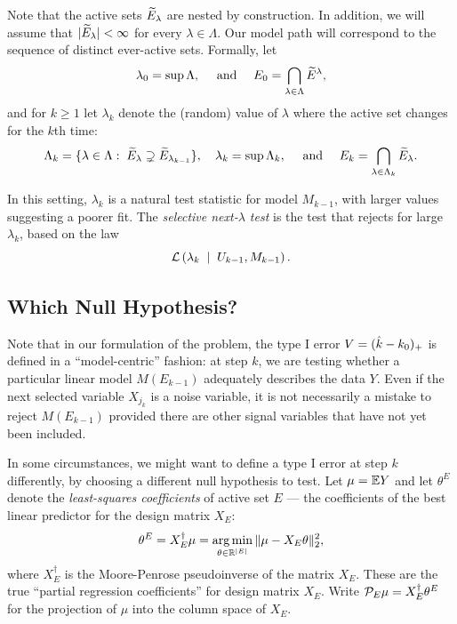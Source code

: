 \documentclass{article}
\begin{document}
Note that the active sets $\widetilde{E}_\lambda$ are nested by construction. In addition, we will assume that $|\widetilde{E}_\lambda|<\infty$ for every $\lambda\in\Lambda$. Our model path will correspond to the sequence of distinct ever-active sets. 
Formally, let 
\[
\lambda_0=\sup \Lambda, \quad \text{ and } \quad 
E_0 = \bigcap_{\lambda\in \Lambda} \widetilde{E}^\lambda,
\]
and for $k\geq 1$ let $\lambda_k$ denote the (random) value of $\lambda$ where the active set changes for the $k$th time:
\begin{equation}
  \Lambda_k = \{\lambda\in \Lambda:\; \widetilde{E}_\lambda \supsetneq \widetilde{E}_{\lambda_{k-1}}\},
  \quad
  \lambda_k = \sup\Lambda_k,
  \quad \text{ and } \quad
  E_k = \bigcap_{\lambda\in\Lambda_k} \widetilde{E}_{\lambda}.
\end{equation}

In this setting, $\lambda_k$ is a natural test statistic for model $M_{k-1}$, with larger values suggesting a poorer fit. The {\em selective next-$\lambda$ test} is the test that rejects for large $\lambda_k$, based on the law
\begin{equation}
\mathcal{L}\left(\lambda_k \;\mid\; U_{k-1}, M_{k-1}\right).
\end{equation}

\subsection{Which Null Hypothesis?}
\label{sec:whichnull}

Note that in our formulation of the problem, the type I error $V=(\hat{k}-k_0)_+$ is defined in a ``model-centric'' fashion: at step $k$, we are testing  whether a particular linear model $M(E_{k-1})$ adequately describes the data $Y$. Even if the next selected variable $X_{j_k}$ is a noise variable, it is not necessarily a mistake to reject $M(E_{k-1})$ provided there are other signal variables that have not yet been included.

In some circumstances, we might want to define a type I error at step $k$ differently, by choosing a different null hypothesis to test. Let $\mu = \mathbb{E} Y$ and let $\theta^E$ denote the {\em least-squares coefficients} of active set $E$ --- the coefficients of the best linear predictor for the design matrix $X_E$:
\[
\theta^E = X_E^\dagger \mu = \operatorname*{arg\,min}_{\theta\in \mathbb{R}^{|E|}} \|\mu - X_E\theta\|_2^2,
\]
where $X_E^\dagger$ is the Moore-Penrose pseudoinverse of the matrix $X_E$. 
These are the true ``partial regression coefficients''  for design matrix $X_E$.
 Write $\mathcal{P}_E\mu = X_E^\dagger \theta^E$ for the projection of $\mu$ into the column space of $X_E$.
\end{document}
